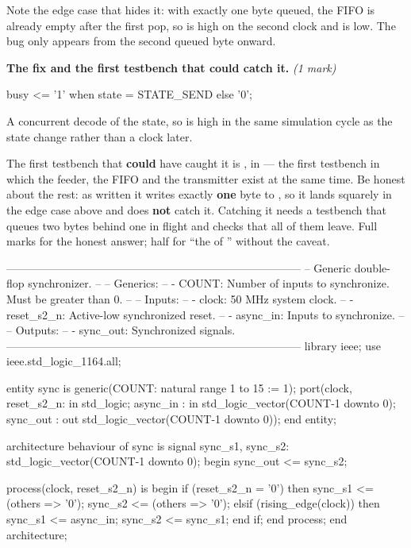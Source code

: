 Note the edge case that hides it: with exactly one byte queued, the FIFO is already empty after the
first pop, so  is high on the second clock and  is low. The bug only
appears from the second queued byte onward.

\textbf{The fix and the first testbench that could catch it.} \textit{(1 mark)}

\begin{vhdlcode}
busy <= '1' when state = STATE_SEND else '0';
\end{vhdlcode}

\noindent A concurrent decode of the state, so  is high in the same simulation cycle as
the state change rather than a clock later.

The first testbench that \textbf{could} have caught it is , in \textbf{}
--- the first testbench in which the feeder, the FIFO and the transmitter exist at the same time. Be
honest about the rest: as written it writes exactly \textbf{one} byte to , so it lands
squarely in the edge case above and does \textbf{not} catch it. Catching it needs a testbench that
queues two bytes behind one in flight and checks that all of them leave. Full marks for the honest
answer; half for ``the  of '' without the caveat.


\begin{vhdlcode}
--------------------------------------------------------------------------------
-- Generic double-flop synchronizer.
--
-- Generics:
--    - COUNT: Number of inputs to synchronize. Must be greater than 0.
--
-- Inputs:
--    - clock: 50 MHz system clock.
--    - reset_s2_n: Active-low synchronized reset.
--    - async_in: Inputs to synchronize.
--
-- Outputs:
--    - sync_out: Synchronized signals.
--------------------------------------------------------------------------------
library ieee;
use ieee.std_logic_1164.all;

entity sync is
    generic(COUNT: natural range 1 to 15 := 1);
    port(clock, reset_s2_n: in std_logic;
         async_in         : in std_logic_vector(COUNT-1 downto 0);
         sync_out         : out std_logic_vector(COUNT-1 downto 0));
end entity;

architecture behaviour of sync is
signal sync_s1, sync_s2: std_logic_vector(COUNT-1 downto 0);
begin
    sync_out <= sync_s2;

    process(clock, reset_s2_n) is
    begin
        if (reset_s2_n = '0') then
            sync_s1 <= (others => '0');
            sync_s2 <= (others => '0');
        elsif (rising_edge(clock)) then
            sync_s1 <= async_in;
            sync_s2 <= sync_s1;
        end if;
    end process;
end architecture;
\end{vhdlcode}

